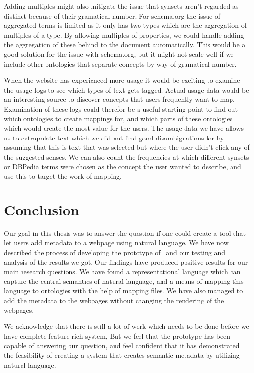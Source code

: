 Adding multiples might also mitigate the issue that synsets aren't regarded as distinct because of their gramatical number.
For schema.org the issue of aggregated terms is limited as it only has two types which are the aggregation of multiples of a type.
By allowing multiples of properties, we could handle adding the aggregation of these behind to the document automatically.
This would be a good solution for the issue with schema.org, but it might not scale well if we include other ontologies
that separate concepts by way of gramatical number.

When the website has experienced more usage it would be exciting to examine the usage logs to see which types of text gets tagged.
Actual usage data would be an interesting source to discover concepts that users frequently want to map.
Examination of these logs could therefor be a useful starting point to find out which ontologies to create mappings for,
and which parts of these ontologies which would create the most value for the users.
The usage data we have allows us to extrapolate text which we did not find good disambiguations for
by assuming that this is text that was selected but where the user didn't click any of the suggested senses.
We can also count the frequencies at which different synsets or DBPedia terms were chosen as the concept the
user wanted to describe, and use this to target the work of mapping.

\section{Conclusion}
Our goal in this thesis was to answer the question if one could create a tool that let users add metadata to a webpage using
natural language.
We have now described the process of developing the prototype of \theartefact\ and our testing and analysis of the results we got.
Our findings have produced positive results for our main research questions.
We have found a representational language which can capture the central semantics of natural language,
and a means of mapping this language to ontologies with the help of mapping files.
We have also managed to add the metadata to the webpages without changing the rendering of the webpages.

We acknowledge that there is still a lot of work which needs to be done before we have complete feature rich system,
But we feel that the prototype has been capable of answering our question,
and feel confident that it has demonstrated the feasibility of creating a system that creates semantic metadata by
utilizing natural language.
